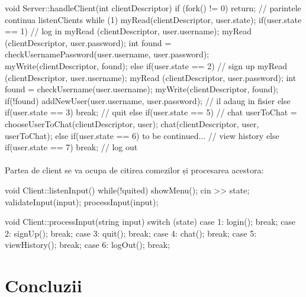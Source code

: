 \documentclass[runningheads]{llncs}
\begin{document}
\begin{queryl}[linewidth=16.2cm, frame=single]
    void Server::handleClient(int clientDescriptor) {
        if (fork() != 0) return; // parintele continua listenClients
        while (1) {
          myRead(clientDescriptor, user.state);
          if(user.state == 1) { // log in
            myRead (clientDescriptor, user.username);
            myRead (clientDescriptor, user.password);
            int found = checkUsernamePassword(user.username, user.password);
            myWrite(clientDescriptor, found);
          }
          else if(user.state == 2) { // sign up
            myRead (clientDescriptor, user.username);
            myRead (clientDescriptor, user.password);
            int found = checkUsername(user.username);
            myWrite(clientDescriptor, found);
            if(!found)
              addNewUser(user.username, user.password); // il adaug in fisier
          }
          else if(user.state == 3) break; // quit
          else if(user.state == 5) { // chat
            userToChat = chooseUserToChat(clientDescriptor, user);
            chat(clientDescriptor, user, userToChat);
          }
          else if(user.state == 6) to be continued... // view history
          else if(user.state == 7) break; // log out
        }
      }
\end{queryl}

\paragraph{}
Partea de client se va ocupa de citirea comezilor și procesarea acestora:

\begin{queryl}[linewidth=12cm, frame=single]
void Client::listenInput() {
    while(!quited) {
        showMenu();
        cin >> state;
        validateInput(input);
        processInput(input);
    }
}
\end{queryl}

\begin{queryl}[linewidth=12cm, frame=single]  
void Client::processInput(string input) {
    switch (state) {
        case 1: login(); break;
        case 2: signUp(); break;
        case 3: quit(); break;
        case 4: chat(); break;
        case 5: viewHistory(); break;
        case 6: logOut(); break;
    }
}
\end{queryl}

\section{Concluzii}
\end{document}
